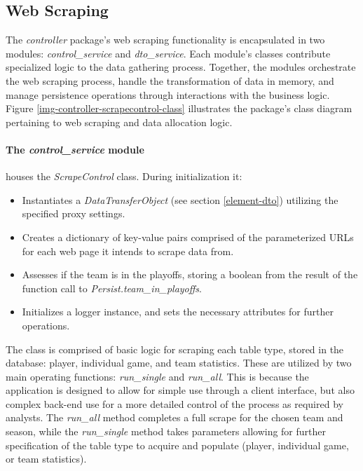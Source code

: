 \documentclass{thesis-ekf}
\theoremstyle{definition}
\theoremstyle{remark}
\begin{document}



\subsection{Web Scraping}
The \emph{controller} package's web scraping functionality is encapsulated in two modules: \emph{control\_service} and \emph{dto\_service}. Each module's classes contribute specialized logic to the data gathering process. Together, the modules orchestrate the web scraping process, handle the transformation of data in memory, and manage persistence operations through interactions with the business logic. Figure \ref{img-controller-scrapecontrol-class} illustrates the package's class diagram pertaining to web scraping and data allocation logic.

\paragraph{The \emph{control\_service} module} houses the \emph{ScrapeControl} class. During initialization it:
\begin{itemize}
  \item Instantiates a \emph{DataTransferObject} (see section \ref{element-dto}) utilizing the specified proxy settings.
  
  \item Creates a dictionary of key-value pairs comprised of the parameterized URLs for each web page it intends to scrape data from.
  
  \item Assesses if the team is in the playoffs, storing a boolean from the result of the function call to \emph{Persist.team\_in\_playoffs}.
  
  \item Initializes a logger instance, and sets the necessary attributes for further operations.
\end{itemize}

The class is comprised of basic logic for scraping each table type, stored in the database: player, individual game, and team statistics. These are utilized by two main operating functions: \emph{run\_single} and \emph{run\_all}. This is because the application is designed to allow for simple use through a client interface, but also complex back-end use for a more detailed control of the process as required by analysts. The \emph{run\_all} method completes a full scrape for the chosen team and season, while the \emph{run\_single} method takes parameters allowing for further specification of the table type to acquire and populate (player, individual game, or team statistics).
\end{document}
